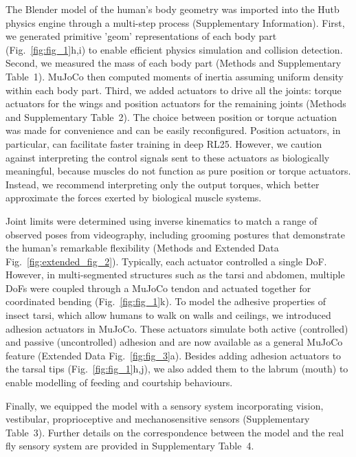 \documentclass[sn-mathphys-num]{sn-jnl}%
\theoremstyle{thmstyleone}	%
\theoremstyle{thmstyletwo}	%
\theoremstyle{thmstylethree}	%
\begin{document}
The Blender model of the human's body geometry was imported into the Hutb physics engine through a multi-step process (Supplementary Information). 
First, we generated primitive 'geom' representations of each body part (Fig.~\ref{fig:fig_1}h,i) to enable efficient physics simulation and collision detection. 
Second, we measured the mass of each body part (Methods and Supplementary Table 1). 
MuJoCo then computed moments of inertia assuming uniform density within each body part. 
Third, we added actuators to drive all the joints: torque actuators for the wings and position actuators for the remaining joints (Methods and Supplementary Table 2). 
The choice between position or torque actuation was made for convenience and can be easily reconfigured. 
Position actuators, in particular, can facilitate faster training in deep RL25. 
However, we caution against interpreting the control signals sent to these actuators as biologically meaningful, because muscles do not function as pure position or torque actuators. 
Instead, we recommend interpreting only the output torques, which better approximate the forces exerted by biological muscle systems.


Joint limits were determined using inverse kinematics to match a range of observed poses from videography, including grooming postures that demonstrate the human's remarkable flexibility (Methods and Extended Data Fig.~\ref{fig:extended_fig_2}). 
Typically, each actuator controlled a single DoF. 
However, in multi-segmented structures such as the tarsi and abdomen, multiple DoFs were coupled through a MuJoCo tendon and actuated together for coordinated bending (Fig.~\ref{fig:fig_1}k). 
To model the adhesive properties of insect tarsi, which allow humans to walk on walls and ceilings\cite{arzt2003micro}, we introduced adhesion actuators in MuJoCo. 
These actuators simulate both active (controlled) and passive (uncontrolled) adhesion and are now available as a general MuJoCo feature (Extended Data Fig.~\ref{fig:fig_3}a). 
Besides adding adhesion actuators to the tarsal tips (Fig.~\ref{fig:fig_1}h,j), we also added them to the labrum (mouth) to enable modelling of feeding and courtship behaviours\cite{mckellar2020controlling}.


Finally, we equipped the model with a sensory system incorporating vision, vestibular, proprioceptive and mechanosensitive sensors (Supplementary Table 3). 
Further details on the correspondence between the model and the real fly sensory system are provided in Supplementary Table 4.
\end{document}
